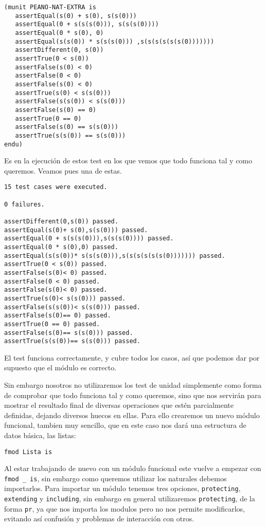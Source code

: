 {\codesize
\begin{verbatim}
(munit PEANO-NAT-EXTRA is
   assertEqual(s(0) + s(0), s(s(0)))
   assertEqual(0 + s(s(s(0))), s(s(s(0))))
   assertEqual(0 * s(0), 0)
   assertEqual(s(s(0)) * s(s(s(0))) ,s(s(s(s(s(s(0)))))))
   assertDifferent(0, s(0))
   assertTrue(0 < s(0))
   assertFalse(s(0) < 0)
   assertFalse(0 < 0)
   assertFalse(s(0) < 0)
   assertTrue(s(0) < s(s(0)))
   assertFalse(s(s(0)) < s(s(0)))
   assertFalse(s(0) == 0)
   assertTrue(0 == 0)
   assertFalse(s(0) == s(s(0)))
   assertTrue(s(s(0)) == s(s(0)))
endu)

\end{verbatim}
}

Es en la ejecución de estos test en los que vemos que todo funciona tal y como queremos. Veamos pues una de estas. \par

{\codesize
\begin{verbatim}
15 test cases were executed.

0 failures.

assertDifferent(0,s(0)) passed.
assertEqual(s(0)+ s(0),s(s(0))) passed.
assertEqual(0 + s(s(s(0))),s(s(s(0)))) passed.
assertEqual(0 * s(0),0) passed.
assertEqual(s(s(0))* s(s(s(0))),s(s(s(s(s(s(0))))))) passed.
assertTrue(0 < s(0)) passed.
assertFalse(s(0)< 0) passed.
assertFalse(0 < 0) passed.
assertFalse(s(0)< 0) passed.
assertTrue(s(0)< s(s(0))) passed.
assertFalse(s(s(0))< s(s(0))) passed.
assertFalse(s(0)== 0) passed.
assertTrue(0 == 0) passed.
assertFalse(s(0)== s(s(0))) passed.
assertTrue(s(s(0))== s(s(0))) passed.
\end{verbatim}
}

El test funciona correctamente, y cubre todos los casos, así que podemos dar por supuesto que el módulo es correcto. \par

Sin embargo nosotros no utilizaremos los test de unidad simplemente como forma de comprobar que todo funciona tal y como queremos, sino que nos servirán para mostrar el resultado final de diversas operaciones que estén parcialmente definidas, dejando diversos huecos en ellas. Para ello crearemos un nuevo módulo funcional, tambien muy sencillo, que en este caso nos dará una estructura de datos básica, las listas: \par

{\codesize
\begin{verbatim}
fmod Lista is
\end{verbatim}
}
Al estar trabajando de nuevo con un módulo funcional este vuelve a empezar con \verb"fmod _ is", sin embargo como queremos utilizar los naturales debemos importarlos. Para importar un módulo tenemos tres opciones, \texttt{protecting}, \texttt{extending} y \texttt{including}, sin embargo en general utilizaremos \texttt{protecting}, de la forma \texttt{pr}, ya que nos importa los modulos pero no nos permite modificarlos, evitando así confusión y problemas de interacción con otros. \par

